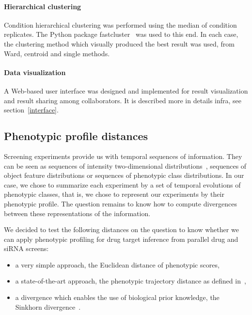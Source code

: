 \paragraph{Hierarchical clustering}
Condition hierarchical clustering was performed using the median of condition replicates. The Python package fastcluster~\cite{fastcluster} was used to this end. In each case, the clustering method which visually produced the best result was used, from Ward, centroid and single methods.
\paragraph{Data visualization}
A Web-based user interface was designed and implemented for result visualization and result sharing among collaborators. It is described more in details infra, see section~\ref{interface}.

\subsection{Phenotypic profile distances}
Screening experiments provide us with temporal sequences of information. They can be seen as sequences of intensity two-dimensional distributions~\cite{pmid22743764}, sequences of object feature distributions or sequences of phenotypic class distributions. In our case, we chose to summarize each experiment by a set of temporal evolutions of phenotypic classes, that is, we chose to represent our experiments by their phenotypic profile. The question remains to know how to compute divergences between these representations of the information.

We decided to test the following distances on the question to know whether we can apply phenotypic profiling for drug target inference from parallel drug and siRNA screens:
\begin{itemize}
\item a very simple approach, the Euclidean distance of phenotypic scores, 
\item a state-of-the-art approach, the phenotypic trajectory distance as defined in~\cite{Walter2010},
\item a divergence which enables the use of biological prior knowledge, the Sinkhorn divergence~\cite{sinkhorn}.
\end{itemize}

